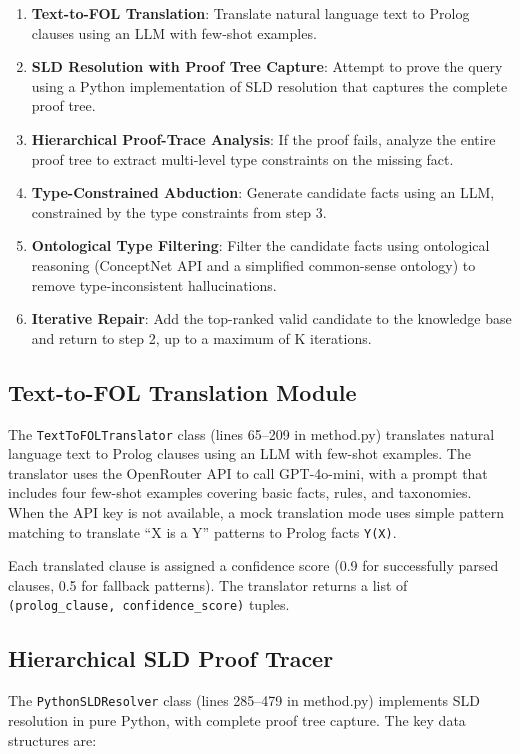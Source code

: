 \documentclass[11pt,letterpaper]{article}
\begin{document}
\begin{enumerate}
    \item \textbf{Text-to-FOL Translation}: Translate natural language text to Prolog clauses using an LLM with few-shot examples.
    \item \textbf{SLD Resolution with Proof Tree Capture}: Attempt to prove the query using a Python implementation of SLD resolution that captures the complete proof tree.
    \item \textbf{Hierarchical Proof-Trace Analysis}: If the proof fails, analyze the entire proof tree to extract multi-level type constraints on the missing fact.
    \item \textbf{Type-Constrained Abduction}: Generate candidate facts using an LLM, constrained by the type constraints from step 3.
    \item \textbf{Ontological Type Filtering}: Filter the candidate facts using ontological reasoning (ConceptNet API and a simplified common-sense ontology) to remove type-inconsistent hallucinations.
    \item \textbf{Iterative Repair}: Add the top-ranked valid candidate to the knowledge base and return to step 2, up to a maximum of K iterations.
\end{enumerate}

\subsection{Text-to-FOL Translation Module}

The \texttt{TextToFOLTranslator} class (lines 65--209 in method.py) translates natural language text to Prolog clauses using an LLM with few-shot examples. The translator uses the OpenRouter API to call GPT-4o-mini, with a prompt that includes four few-shot examples covering basic facts, rules, and taxonomies. When the API key is not available, a mock translation mode uses simple pattern matching to translate ``X is a Y'' patterns to Prolog facts \texttt{Y(X)}.

Each translated clause is assigned a confidence score (0.9 for successfully parsed clauses, 0.5 for fallback patterns). The translator returns a list of \texttt{(prolog\_clause, confidence\_score)} tuples.

\subsection{Hierarchical SLD Proof Tracer}

The \texttt{PythonSLDResolver} class (lines 285--479 in method.py) implements SLD resolution in pure Python, with complete proof tree capture. The key data structures are:
\end{document}
